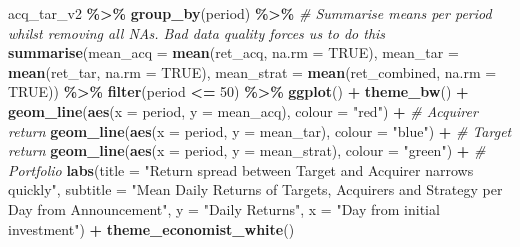 \documentclass[
]{article}
\newenvironment{Shaded}{\begin{snugshade}}{\end{snugshade}}
\newcommand{\CommentTok}[1]{\textcolor[rgb]{0.56,0.35,0.01}{\textit{#1}}}
\newcommand{\DataTypeTok}[1]{\textcolor[rgb]{0.13,0.29,0.53}{#1}}
\newcommand{\DecValTok}[1]{\textcolor[rgb]{0.00,0.00,0.81}{#1}}
\newcommand{\KeywordTok}[1]{\textcolor[rgb]{0.13,0.29,0.53}{\textbf{#1}}}
\newcommand{\NormalTok}[1]{#1}
\newcommand{\OperatorTok}[1]{\textcolor[rgb]{0.81,0.36,0.00}{\textbf{#1}}}
\newcommand{\OtherTok}[1]{\textcolor[rgb]{0.56,0.35,0.01}{#1}}
\newcommand{\StringTok}[1]{\textcolor[rgb]{0.31,0.60,0.02}{#1}}
\begin{document}
\begin{Shaded}
\begin{Highlighting}[]
\NormalTok{acq\_tar\_v2 }\OperatorTok{\%\textgreater{}\%}
\StringTok{  }\KeywordTok{group\_by}\NormalTok{(period) }\OperatorTok{\%\textgreater{}\%}
\StringTok{  }\CommentTok{\# Summarise means per period whilst removing all NAs. Bad data quality forces us to do this}
\StringTok{  }\KeywordTok{summarise}\NormalTok{(}\DataTypeTok{mean\_acq =} \KeywordTok{mean}\NormalTok{(ret\_acq, }\DataTypeTok{na.rm =} \OtherTok{TRUE}\NormalTok{),}
            \DataTypeTok{mean\_tar =} \KeywordTok{mean}\NormalTok{(ret\_tar, }\DataTypeTok{na.rm =} \OtherTok{TRUE}\NormalTok{),}
            \DataTypeTok{mean\_strat =} \KeywordTok{mean}\NormalTok{(ret\_combined, }\DataTypeTok{na.rm =} \OtherTok{TRUE}\NormalTok{)) }\OperatorTok{\%\textgreater{}\%}
\StringTok{  }\KeywordTok{filter}\NormalTok{(period }\OperatorTok{\textless{}=}\StringTok{ }\DecValTok{50}\NormalTok{) }\OperatorTok{\%\textgreater{}\%}
\StringTok{  }\KeywordTok{ggplot}\NormalTok{() }\OperatorTok{+}
\StringTok{  }\KeywordTok{theme\_bw}\NormalTok{() }\OperatorTok{+}
\StringTok{  }\KeywordTok{geom\_line}\NormalTok{(}\KeywordTok{aes}\NormalTok{(}\DataTypeTok{x =}\NormalTok{ period, }\DataTypeTok{y =}\NormalTok{ mean\_acq), }\DataTypeTok{colour =} \StringTok{"red"}\NormalTok{) }\OperatorTok{+}\StringTok{ }\CommentTok{\# Acquirer return}
\StringTok{  }\KeywordTok{geom\_line}\NormalTok{(}\KeywordTok{aes}\NormalTok{(}\DataTypeTok{x =}\NormalTok{ period, }\DataTypeTok{y =}\NormalTok{ mean\_tar), }\DataTypeTok{colour =} \StringTok{"blue"}\NormalTok{) }\OperatorTok{+}\StringTok{ }\CommentTok{\# Target return}
\StringTok{  }\KeywordTok{geom\_line}\NormalTok{(}\KeywordTok{aes}\NormalTok{(}\DataTypeTok{x =}\NormalTok{ period, }\DataTypeTok{y =}\NormalTok{ mean\_strat), }\DataTypeTok{colour =} \StringTok{"green"}\NormalTok{) }\OperatorTok{+}\StringTok{ }\CommentTok{\# Portfolio }
\StringTok{  }\KeywordTok{labs}\NormalTok{(}\DataTypeTok{title =} \StringTok{"Return spread between Target and Acquirer narrows quickly"}\NormalTok{,}
       \DataTypeTok{subtitle =} \StringTok{"Mean Daily Returns of Targets, Acquirers and Strategy per Day from Announcement"}\NormalTok{,}
       \DataTypeTok{y =} \StringTok{"Daily Returns"}\NormalTok{,}
       \DataTypeTok{x =} \StringTok{"Day from initial investment"}\NormalTok{) }\OperatorTok{+}\StringTok{ }
\StringTok{  }\KeywordTok{theme\_economist\_white}\NormalTok{()}
\end{Highlighting}
\end{Shaded}
\end{document}
